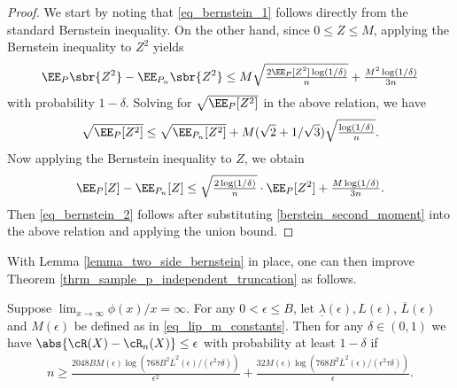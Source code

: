 \documentclass[9pt]{article} %
\numberwithin{equation}{section}
\renewcommand{\frac}[2]{\tfrac{#1}{#2}}
\begin{document}
\begin{proof}
We start by noting that \eqref{eq_bernstein_1} follows directly from the standard Bernstein inequality. 
On the other hand, since $0 \leq Z \leq M$, applying the Bernstein inequality to $Z^2$ yields 
\begin{align*}
\EE_P \sbr{Z^2} - \EE_{P_n} \sbr{Z^2} \leq M \sqrt{\frac{2 \EE_P[Z^2] \log(1/\delta) }{n} }  + \frac{M^2 \log(1/\delta)}{3n}
\end{align*}
with probability $1-\delta$. 
Solving for $\sqrt{\EE_P [Z^2]}$ in the above relation, we have 
\begin{align}\label{berstein_second_moment}
\sqrt{\EE_P [Z^2]} \leq  \sqrt{\EE_{P_n} [Z^2]} +  M (\sqrt{2} + 1/\sqrt{3}) \sqrt{\frac{\log(1/\delta)}{n} } .
\end{align}
Now applying the Bernstein inequality to $Z$, we obtain 
\begin{align*}
\EE_P [Z] - \EE_{P_n} [Z] \leq \sqrt{\frac{2  \log(1/\delta)}{n}} \cdot \EE_P[Z^2]+ \frac{M \log(1/\delta)}{3n}.
\end{align*}
Then \eqref{eq_bernstein_2} follows after substituting \eqref{berstein_second_moment} into the above relation and applying the union bound. 
\end{proof}


With Lemma \ref{lemma_two_side_bernstein} in place, one can then improve Theorem \ref{thrm_sample_p_independent_truncation} as follows. 


\begin{theorem}\label{thrm_sample_bernstein}
Suppose $\lim_{x \to \infty} \phi(x) / x = \infty$. 
For any $0 < \epsilon \leq B $, let 
$\underline{\lambda}(\epsilon), L(\epsilon)$, 
 $\overline{L}(\epsilon)$ and $M(\epsilon)$ be defined as in \eqref{eq_lip_m_constants}.
Then 
for any $\delta \in (0,1)$  
we have $\abs{\cR(X) - \cR_n(X)} \leq \epsilon$ with probability at least $1-\delta$
 if 
\begin{align*}
n \geq 
\frac{2048 B M(\epsilon)  \log (768 B^2 \overline{L}^2(\epsilon)/ (\epsilon^2 \tau \delta))}{\epsilon^2} 
+ 
\frac{32 M(\epsilon)  \log (768 B^2 \overline{L}^2(\epsilon)/ (\epsilon^2 \tau \delta))}{\epsilon} .
\end{align*}
\end{theorem}
\end{document}
